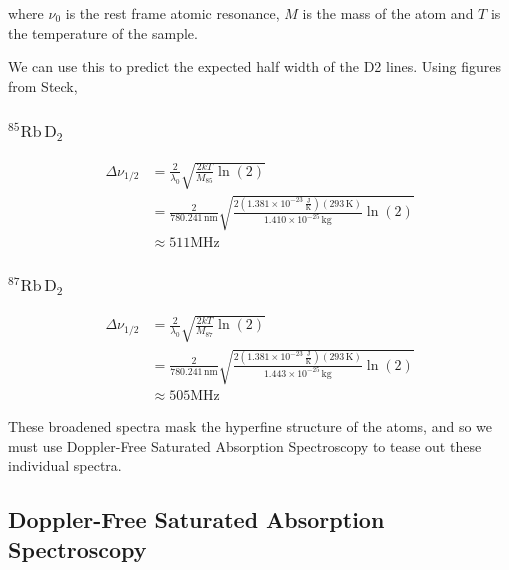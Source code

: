 \documentclass[12pt]{article}
\begin{document}
where $\nu_0$ is the rest frame atomic resonance, $M$ is the mass of the atom and $T$ is the temperature of the sample.

We can use this to predict the expected half width of the D2 lines.  Using figures from Steck\cite{steck85Rb}\cite{steck87Rb},

\subsubsection*{${}^{85}\text{Rb}\,\text{D}_2$}

\begin{align}
	\Delta \nu_{1/2} &= \frac{2}{\lambda_0}\sqrt{\frac{2kT}{M_{85}}\ln(2)}\nonumber\\
	&= \frac{2}{780.241\,\text{nm}}\sqrt{\frac{2\left(1.381\times10^{-23}\,\frac{\text{J}}{\text{K}}\right)\left(293\,\text{K}\right)}{1.410\times10^{-25}\,\text{kg}}\ln(2)}\nonumber\\
	&\approx 511 \text{MHz} \label{pred:85D2}
\end{align}

\subsubsection*{${}^{87}\text{Rb}\,\text{D}_2$}

\begin{align}
\Delta \nu_{1/2} &= \frac{2}{\lambda_0}\sqrt{\frac{2kT}{M_{87}}\ln(2)}\nonumber\\
&= \frac{2}{780.241\,\text{nm}}\sqrt{\frac{2\left(1.381\times10^{-23}\,\frac{\text{J}}{\text{K}}\right)\left(293\,\text{K}\right)}{1.443\times10^{-25}\,\text{kg}}\ln(2)}\nonumber\\
&\approx 505 \text{MHz}\label{pred:87D2}
\end{align}

These broadened spectra mask the hyperfine structure of the atoms, and so we must use Doppler-Free Saturated Absorption Spectroscopy to tease out these individual spectra.

\subsection*{Doppler-Free Saturated Absorption Spectroscopy}
\end{document}
